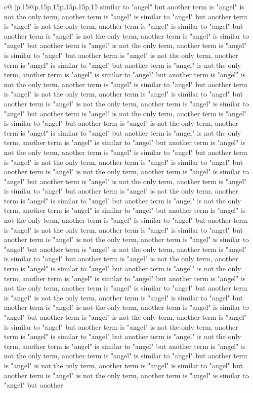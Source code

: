 \documentclass{article}
\begin{document}
{\begin{supertabular}{c@{$\;$}|p{.15\linewidth}@{}p{.15\linewidth}p{.15\linewidth}p{.15\linewidth}p{.15\linewidth}p{.15\linewidth}}
{{{similar to "angel" but another term is "angel" is not the only term, another term is "angel" is similar to "angel" but another term is "angel" is not the only term, another term is "angel" is similar to "angel" but another term is "angel" is not the only term, another term is "angel" is similar to "angel" but another term is "angel" is not the only term, another term is "angel" is similar to "angel" but another term is "angel" is not the only term, another term is "angel" is similar to "angel" but another term is "angel" is not the only term, another term is "angel" is similar to "angel" but another term is "angel" is not the only term, another term is "angel" is similar to "angel" but another term is "angel" is not the only term, another term is "angel" is similar to "angel" but another term is "angel" is not the only term, another term is "angel" is similar to "angel" but another term is "angel" is not the only term, another term is "angel" is similar to "angel" but another term is "angel" is not the only term, another term is "angel" is similar to "angel" but another term is "angel" is not the only term, another term is "angel" is similar to "angel" but another term is "angel" is not the only term, another term is "angel" is similar to "angel" but another term is "angel" is not the only term, another term is "angel" is similar to "angel" but another term is "angel" is not the only term, another term is "angel" is similar to "angel" but another term is "angel" is not the only term, another term is "angel" is similar to "angel" but another term is "angel" is not the only term, another term is "angel" is similar to "angel" but another term is "angel" is not the only term, another term is "angel" is similar to "angel" but another term is "angel" is not the only term, another term is "angel" is similar to "angel" but another term is "angel" is not the only term, another term is "angel" is similar to "angel" but another term is "angel" is not the only term, another term is "angel" is similar to "angel" but another term is "angel" is not the only term, another term is "angel" is similar to "angel" but another term is "angel" is not the only term, another term is "angel" is similar to "angel" but another term is "angel" is not the only term, another term is "angel" is similar to "angel" but another term is "angel" is not the only term, another term is "angel" is similar to "angel" but another term is "angel" is not the only term, another term is "angel" is similar to "angel" but another term is "angel" is not the only term, another term is "angel" is similar to "angel" but another term is "angel" is not the only term, another term is "angel" is similar to "angel" but another term is "angel" is not the only term, another term is "angel" is similar to "angel" but another term is "angel" is not the only term, another term is "angel" is similar to "angel" but another term is "angel" is not the only term, another term is "angel" is similar to "angel" but another term is "angel" is not the only term, another term is "angel" is similar to "angel" but another term is "angel" is not the only term, another term is "angel" is similar to "angel" but another }}}
\end{supertabular}}
\end{document}

